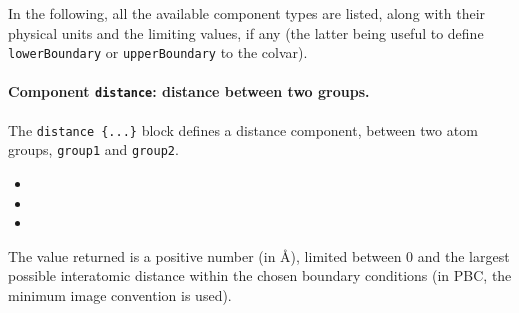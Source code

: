 In the following, all the available component types are listed, along
with their physical units and the limiting values, if any (the latter
being useful to define \texttt{lowerBoundary} or
\texttt{upperBoundary} to the colvar).


\paragraph*{Component \texttt{distance}: distance between two groups.}
The \texttt{distance \{...\}} block defines a distance component,
between two atom groups, \texttt{group1} and \texttt{group2}.
\begin{itemize}
\item %
\item %
\item %
\end{itemize}

The value returned is a positive number (in \AA), limited between $0$
and the largest possible interatomic distance within the chosen
boundary conditions (in PBC, the minimum image convention is used).


